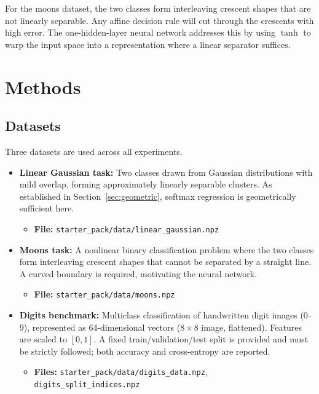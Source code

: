 \documentclass[sigconf,screen,nonacm]{acmart}
\begin{document}
For the moons dataset, the two classes form interleaving crescent shapes that are not linearly separable. Any affine decision rule will cut through the crescents with high error. The one-hidden-layer neural network addresses this by using $\tanh$ to warp the input space into a representation where a linear separator suffices.

\section{Methods}

\subsection{Datasets}
Three datasets are used across all experiments.
\begin{itemize}[leftmargin=*]
    \item \textbf{Linear Gaussian task:} Two classes drawn from Gaussian distributions with mild overlap, forming approximately linearly separable clusters. As established in Section~\ref{sec:geometric}, softmax regression is geometrically sufficient here.
    \begin{itemize}
        \item \textbf{File:} \texttt{starter\_pack/data/linear\_gaussian.npz}
    \end{itemize}
    \item \textbf{Moons task:} A nonlinear binary classification problem where the two classes form interleaving crescent shapes that cannot be separated by a straight line. A curved boundary is required, motivating the neural network.
    \begin{itemize}
        \item \textbf{File:} \texttt{starter\_pack/data/moons.npz}
    \end{itemize}
    \item \textbf{Digits benchmark:} Multiclass classification of handwritten digit images (0--9), represented as 64-dimensional vectors ($8 \times 8$ image, flattened). Features are scaled to $[0, 1]$. A fixed train/validation/test split is provided and must be strictly followed; both accuracy and cross-entropy are reported.
    \begin{itemize}
        \item \textbf{Files:} \texttt{starter\_pack/data/digits\_data.npz}, \texttt{digits\_split\_indices.npz}
    \end{itemize}
\end{itemize}
\end{document}
